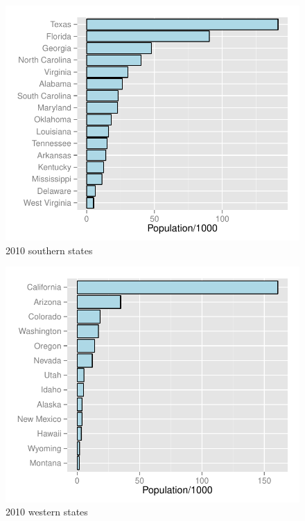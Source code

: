 \documentclass[letterpaper, landscape]{article}
\begin{document}
  \begin{figure}[H]
    \centering
    \includegraphics[scale = 0.8]{figures/south_by_state_2010.pdf}
    \caption{2010 southern states}
  \end{figure}

  \begin{figure}[H]
    \centering
    \includegraphics[scale = 0.8]{figures/west_by_state_2010.pdf}
    \caption{2010 western states}
  \end{figure}

\end{document}

